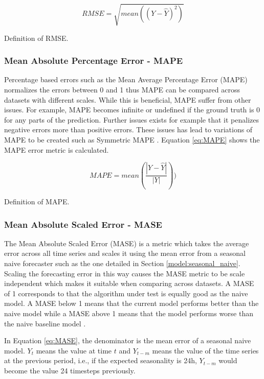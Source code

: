 \begin{eqfloat}
  \begin{equation}
    RMSE = \sqrt{mean((Y - \hat{Y})^2)}
    \label{eq:RMSE}
  \end{equation}
  \caption{Definition of RMSE.}
\end{eqfloat}

\subsubsection{Mean Absolute Percentage Error - MAPE}
Percentage based errors such as the Mean Average Percentage Error (MAPE) normalizes the errors between 0 and 1 thus MAPE can be compared across datasets with different scales. While this is beneficial, MAPE suffer from other issues. For example, MAPE becomes infinite or undefined if the ground truth is 0 for any parts of the prediction. Further issues exists for example that it penalizes negative errors more than positive errors. These issues has lead to variations of MAPE to be created such as Symmetric MAPE \cite{hyndman_forecasting_3rd,gluonts-github}. Equation \ref{eq:MAPE} shows the MAPE error metric is calculated.

\begin{eqfloat}
  \begin{equation}
    MAPE = mean(\frac{|Y - \hat{Y}|}{|Y|}))
    \label{eq:MAPE}
  \end{equation}
  \caption{Definition of MAPE.}
\end{eqfloat}

\subsubsection{Mean Absolute Scaled Error - MASE}
The Mean Absolute Scaled Error (MASE) is a metric which takes the average error across all time series and scales it using the mean error from a seasonal naive forecaster such as the one detailed in Section \ref{model:seasonal_naive}. Scaling the forecasting error in this way causes the MASE metric to be scale independent which makes it suitable when comparing across datasets. A MASE of 1 corresponds to that the algorithm under test is equally good as the naive model. A MASE below 1 means that the current model performs better than the naive model while a MASE above 1 means that the model performs worse than the naive baseline model \cite{hyndman_forecasting_3rd,gluonts-github}.

In Equation \ref{eq:MASE}, the denominator is the mean error of a seasonal naive model. \(Y_t\) means the value at time \(t\) and \(Y_{t-m}\) means the value of the time series at the previous period, i.e., if the expected seasonality is 24h, \(Y_{t-m}\) would become the value 24 timesteps previously.


